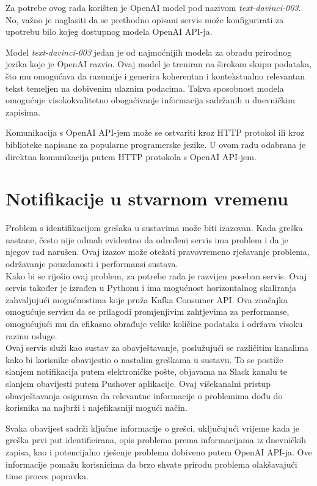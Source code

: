 \documentclass[times, utf8, diplomski]{fer}
\begin{document}
Za potrebe ovog rada korišten je OpenAI model pod nazivom \emph{text-davinci-003}. No, važno je naglasiti da se prethodno opisani servis može konfigurirati za upotrebu bilo kojeg dostupnog modela OpenAI API-ja.

Model \emph{text-davinci-003} jedan je od najmoćnijih modela za obradu prirodnog jezika koje je OpenAI razvio. Ovaj model je treniran na širokom skupu podataka, što mu omogućava da razumije i generira koherentan i kontekstualno relevantan tekst temeljen na dobivenim ulaznim podacima. Takva sposobnost modela omogućuje visokokvalitetno obogaćivanje informacija sadržanih u dnevničkim zapisima.

Komunikacija s OpenAI API-jem može se ostvariti kroz HTTP protokol ili kroz biblioteke napisane za popularne programerske jezike. U ovom radu odabrana je direktna komunikacija putem HTTP protokola s OpenAI API-jem.

\section{Notifikacije u stvarnom vremenu}
\label{sec:notifService}

Problem s identifikacijom grešaka u sustavima može biti izazovan. Kada greška nastane, često nije odmah evidentno da određeni servis ima problem i da je njegov rad narušen. Ovaj izazov može otežati pravovremeno rješavanje problema, održavanje pouzdanosti i performansi sustava.\\

Kako bi se riješio ovaj problem, za potrebe rada je razvijen poseban servis. Ovaj servis također je izrađen u Pythonu i ima mogućnost horizontalnog skaliranja zahvaljujući mogućnostima koje pruža Kafka Consumer API. Ova značajka omogućuje servisu da se prilagodi promjenjivim zahtjevima za performanse, omogućujući mu da efikasno obrađuje velike količine podataka i održava visoku razinu usluge.\\

Ovaj servis služi kao sustav za obavještavanje, poslužujući se različitim kanalima kako bi korisnike obavijestio o nastalim greškama u sustavu. To se postiže slanjem notifikacija putem elektroničke pošte, objavama na Slack kanalu te slanjem obavijesti putem Pushover aplikacije. Ovaj višekanalni pristup obavještavanja osigurava da relevantne informacije o problemima dođu do korisnika na najbrži i najefikasniji mogući način.

\clearpage
Svaka obavijest sadrži ključne informacije o grešci, uključujući vrijeme kada je greška prvi put identificirana, opis problema prema informacijama iz dnevničkih zapisa, kao i potencijalno rješenje problema dobiveno putem OpenAI API-ja. Ove informacije pomažu korisnicima da brzo shvate prirodu problema olakšavajući time proces popravka.\\
\end{document}
